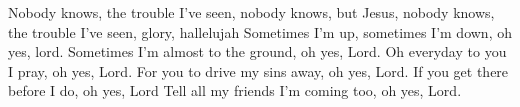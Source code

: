 \beginverse*
Nobody knows, the trouble I’ve seen,
nobody knows, but Jesus,
nobody knows, the trouble I’ve seen,
glory, hallelujah
\endverse
\beginverse*
Sometimes I’m up, sometimes I’m down,
oh yes, lord.
Sometimes I’m almost to the ground,
oh yes, Lord.
\endverse
\beginverse*
Oh everyday to you I pray,
oh yes, Lord.
For you to drive my sins away, 
oh yes, Lord.
If you get there before I do,
oh yes, Lord
Tell all my friends I’m coming too,
oh yes, Lord.
\endverse
\endsong